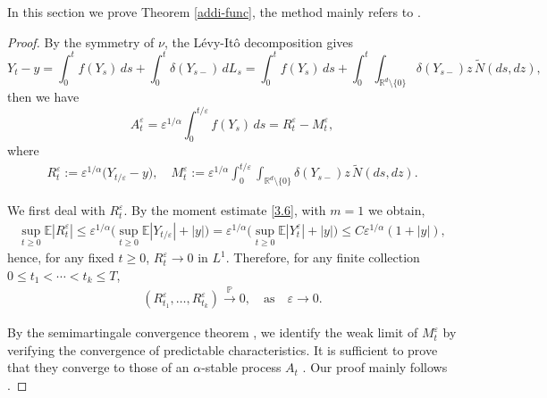 \documentclass[11pt,reqno]{amsart}
\numberwithin{equation}{section}
\begin{document}
In this section we prove Theorem \ref{addi-func}, the method mainly refers to \cite[p.1094, Theorem 1]{BF}.

\begin{proof}
By the symmetry of $\nu$, the Lévy-Itô decomposition gives
\begin{equation*}
	Y_t-y=\int_0^t f(Y_s)\,ds+\int_0^t\delta(Y_{s-})\,dL_s=\int_0^t f(Y_s)\,ds+\int_0^t\int_{\mathbb R^d\setminus\{0\}}
	\delta(Y_{s-})z\,\tilde N(ds,dz),
\end{equation*}
then we have
\begin{equation}\label{a-m}
A_t^\varepsilon=\varepsilon^{1/\alpha}
\int_0^{t/\varepsilon}f(Y_s)\,ds=R_t^\varepsilon-M_t^\varepsilon,
\end{equation}
where
\begin{align*}
R_t^\varepsilon:=\varepsilon^{1/\alpha}\bigl(Y_{t/\varepsilon}-y\bigr),\quad	M_t^\varepsilon:=\varepsilon^{1/\alpha}\int_0^{t/\varepsilon}\int_{\mathbb R^d\setminus\{0\}}
\delta(Y_{s-})z\,\tilde N(ds,dz).
\end{align*}

We first deal with $R^\varepsilon_t$. By the moment estimate
\eqref{3.6}, with $m=1$ we obtain,
\begin{align}\label{R-est}
	\sup_{t\geq0}\mathbb E|R_t^\varepsilon|
	\leq\varepsilon^{1/\alpha}	\big(
	\sup_{t\geq0}\mathbb E|Y_{t/\varepsilon}|+|y|
	\big)=\varepsilon^{1/\alpha}
	\big(\sup_{t\geq0}\mathbb E|Y_t^\varepsilon|+|y|\big)
	\leq C\varepsilon^{1/\alpha}(1+|y|),
\end{align}
hence, for any fixed $t\ge0$,
 $R_t^\varepsilon\to0$ in $L^1$. Therefore, for any finite
collection $0\le t_1<\cdots<t_k\le T$,
\begin{align}\label{rt}
(R_{t_1}^\varepsilon,\ldots,R_{t_k}^\varepsilon)
\xrightarrow{\mathbb{P}}0,  \quad \text{as}\quad \varepsilon\to 0.
\end{align}
	


By the semimartingale
convergence theorem \cite[p.459, Theorem 1.18]{JS}, we identify the weak limit of $M^\varepsilon_t$ by verifying the convergence of predictable characteristics. It is sufficient to prove that they converge to those of an $\alpha$-stable process $A_t$
\cite[p.110]{ET}. Our proof mainly follows
\cite[p.1094, Theorem 1]{BF}.


\end{proof}
\end{document}
